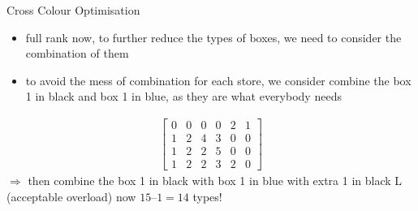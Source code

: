 
\begin{frame}{Cross Colour Optimisation}
	\begin{itemize}
	\item full rank now, to further reduce the types of boxes, we need to consider the combination of them
	\item to avoid the mess of combination for each store, we consider combine the box 1 in black and box 1 in blue, as they are what everybody needs
	\end{itemize}
    \begin{align}
        \begin{bmatrix}
            0& 0& 0& 0& 2& 1\\
            1& 2& 4& 3& 0& 0 \\
             1& 2& 2& 5& 0& 0\\
             1& 2& 2& 3& 2& 0
        \end{bmatrix}
    \end{align}
    $\Rightarrow$ then combine the box 1 in black with box 1 in blue
    with extra 1 in black L (acceptable overload) now $15 – 1 = 14$
    types!
\end{frame}
